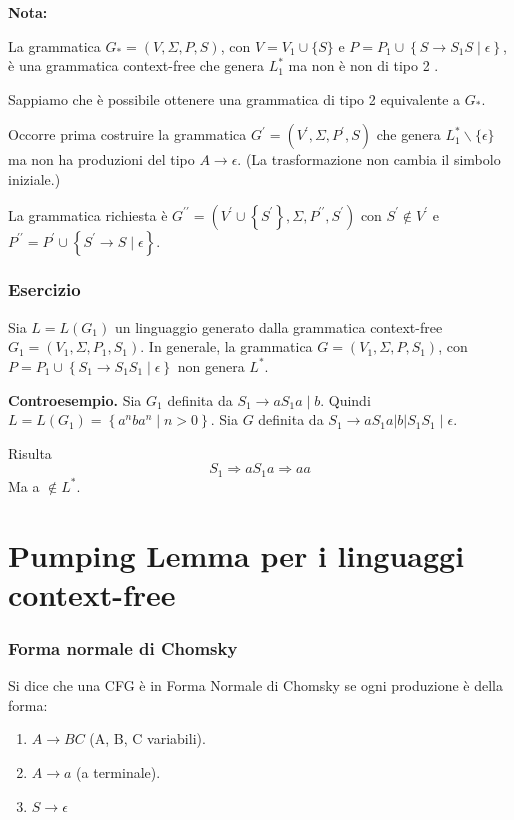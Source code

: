\vspace{5mm}

\textbf{Nota:}

La grammatica $G_{*}=(V, \Sigma, P, S)$, con $V=V_{1} \cup\{S\}$ e $P=P_{1} \cup\left\{S \rightarrow S_{1} S \mid \epsilon\right\}$, è una grammatica context-free che genera $L_{1}^{*}$ ma non è non di tipo 2 .

Sappiamo che è possibile ottenere una grammatica di tipo 2 equivalente a $G_{*}$.

Occorre prima costruire la grammatica $G^{\prime}=\left(V^{\prime}, \Sigma, P^{\prime}, S\right)$ che genera $L_{1}^{*} \backslash\{\epsilon\}$ ma non ha produzioni del tipo $A \rightarrow \epsilon$. (La trasformazione non cambia il simbolo iniziale.)

La grammatica richiesta è $G^{\prime \prime}=\left(V^{\prime} \cup\left\{S^{\prime}\right\}, \Sigma, P^{\prime \prime}, S^{\prime}\right)$ con $S^{\prime} \notin V^{\prime}$ e $P^{\prime \prime}=P^{\prime} \cup\left\{S^{\prime} \rightarrow S \mid \epsilon\right\}$.

\subsubsection{Esercizio}

Sia $L=L\left(G_{1}\right)$ un linguaggio generato dalla grammatica context-free $G_{1}=\left(V_{1}, \Sigma, P_{1}, S_{1}\right)$. In generale, la grammatica $G=\left(V_{1}, \Sigma, P, S_{1}\right)$, con $P=P_{1} \cup\left\{S_{1} \rightarrow S_{1} S_{1} \mid \epsilon\right\}$ non genera $L^{*} .$

\textbf{Controesempio.} Sia $G_{1}$ definita da $S_{1} \rightarrow a S_{1} a \mid b$. Quindi $L=L\left(G_{1}\right)=\left\{a^{n} b a^{n} \mid n>0\right\}$. Sia $G$ definita da $S_{1} \rightarrow a S_{1} a|b| S_{1} S_{1} \mid \epsilon$. 

Risulta
$$
S_{1} \Rightarrow a S_{1} a \Rightarrow a a
$$
Ma a $\notin L^{*}$.

\section{Pumping Lemma per i linguaggi context-free}

\subsubsection{Forma normale di Chomsky}

Si dice che una CFG è in Forma Normale di Chomsky se ogni produzione è della forma:
\begin{enumerate}
    \item $A \rightarrow BC$ (A, B, C variabili).
    \item $A \rightarrow a$ (a terminale).
    \item $S \rightarrow \epsilon$
\end{enumerate}

